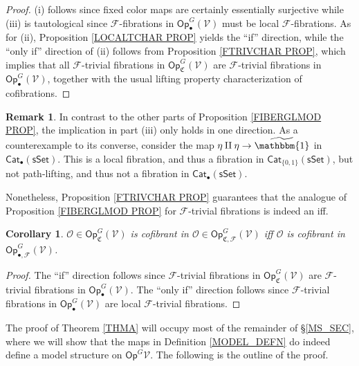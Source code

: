 \documentclass[a4paper,10pt
 ,final
]{article}%
\numberwithin{equation}{section}
\numberwithin{figure}{section}
\newtheorem{corollary}[equation]{Corollary}%
\theoremstyle{definition} %
\newtheorem{remark}[equation]{Remark}%
\newcommand{\Op}{\mathsf{Op}}%
\newcommand{\F}{\ensuremath{\mathcal F}}
\newcommand{\V}{\ensuremath{\mathcal V}}
\renewcommand{\O}{\ensuremath{\mathcal O}}
\newcommand{\1}{\ensuremath{\mathbbm 1}}%
\begin{document}
\begin{proof}
	(i) follows since fixed color maps are certainly essentially surjective while (iii) is tautological since 
	$\F$-fibrations in $\mathsf{Op}_{\bullet}^G(\V)$ must be local $\F$-fibrations.
	As for (ii), Proposition \ref{LOCALTCHAR PROP} yields
	the ``if'' direction,
	while the ``only if'' direction of (ii) follows from 
	Proposition \ref{FTRIVCHAR PROP},
	which implies that all $\F$-trivial fibrations in $\mathsf{Op}_{\mathfrak{C}}^G(\V)$
	are $\F$-trivial fibrations in 
	$\mathsf{Op}_{\bullet}^G(\V)$,
	together with the usual lifting 
	property characterization of cofibrations.
\end{proof}


\begin{remark}
In contrast to the other parts of 
Proposition \ref{FIBERGLMOD PROP},
the implication in part (iii) 
only holds in one direction. 
As a counterexample to its converse, 
consider the map $\eta \amalg \eta \to \widetilde{\mathbbm{1}}$
in $\mathsf{Cat}_{\bullet}(\mathsf{sSet})$. This is a local fibration, 
and thus a fibration in $\mathsf{Cat}_{\{0,1\}}(\mathsf{sSet})$,
but not path-lifting, and thus not a fibration in $\mathsf{Cat}_{\bullet}(\mathsf{sSet})$.

Nonetheless, Proposition \ref{FTRIVCHAR PROP}
guarantees that the analogue of Proposition \ref{FIBERGLMOD PROP}
for $\F$-trivial fibrations is indeed an iff.
\end{remark}



\begin{corollary}
      $\O \in \Op^G_{\mathfrak C}(\V)$ is cofibrant in
      $\O \in \Op^G_{\mathfrak C,\mathcal{F}}(\V)$
      iff $\O$ is cofibrant in $\Op^G_{\bullet,\F}(\V)$.
\end{corollary}

\begin{proof}
	The ``if'' direction follows since
	$\F$-trivial fibrations in $ \Op^G_{\mathfrak C}(\V)$
	are
	$\F$-trivial fibrations in $ \Op^G_{\bullet}(\V)$.
	The ``only if'' direction follows since
	$\F$-trivial fibrations in $ \Op^G_{\bullet}(\V)$
	are local $\F$-trivial fibrations.
\end{proof}


The proof of Theorem \ref{THMA} will occupy most of 
the remainder of \S \ref{MS_SEC},
where we will show that the maps in Definition \ref{MODEL_DEFN}
do indeed define a model structure on $\mathsf{Op}^G{\V}$.
The following is the outline of the proof.
\end{document}
